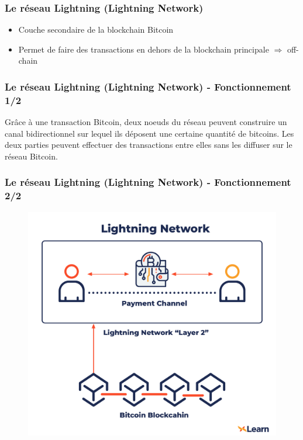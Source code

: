 \begin{frame}
  \frametitle{Le réseau Lightning (Lightning Network)}
  \begin{itemize}
    \item Couche secondaire de la blockchain Bitcoin \newline
    \item Permet de faire des transactions en dehors de la blockchain principale $\Rightarrow$ off-chain
  \end{itemize}
\end{frame}

\begin{frame}
  \frametitle{Le réseau Lightning (Lightning Network) - Fonctionnement 1/2}
  Grâce à une transaction Bitcoin, deux noeuds du réseau peuvent construire un canal bidirectionnel sur lequel ils déposent une certaine quantité de bitcoins.
  \newline
  Les deux parties peuvent effectuer des transactions entre elles sans les diffuser sur le réseau Bitcoin.
  
\end{frame}

\begin{frame}
  \frametitle{Le réseau Lightning (Lightning Network) - Fonctionnement 2/2}
  \centering
  \begin{figure}
    \includegraphics[scale = 0.24]{decentralisation/lightning.jpg}
  \end{figure}
  
\end{frame}

